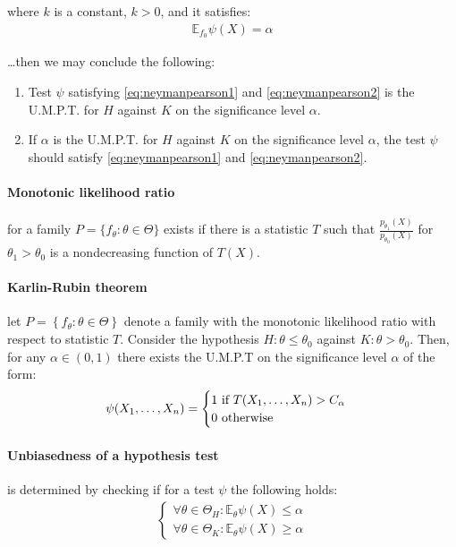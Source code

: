 where $k$ is a constant, $k > 0$, and it satisfies:
\begin{gather*}
\mathbb{E}_{f_0} \psi(X) = \alpha
\label{eq:neymanpearson2} \tag{B}
\end{gather*}

\noindent \ldots then we may conclude the following:
\begin{enumerate}

  \item Test $\psi$ satisfying \eqref{eq:neymanpearson1} and \eqref{eq:neymanpearson2} is the
  U.M.P.T. for $H$ against $K$ on the significance level $\alpha$.

  \item If $\alpha$ is the U.M.P.T. for $H$ against $K$ on the significance level $\alpha$, the test
  $\psi$ should satisfy \eqref{eq:neymanpearson1} and \eqref{eq:neymanpearson2}.

\end{enumerate}

\paragraph{Monotonic likelihood ratio}
for a family $P = \{ f_\theta : \theta \in \Theta \}$ exists if there is a statistic $T$
such that $\frac{ p_{\theta_1}(X) }{ p_{\theta_0}(X) }$ for $\theta_1 > \theta_0$ is a nondecreasing
function of $T(X)$.

\paragraph{Karlin-Rubin theorem}
let $P = \left\{ f_\theta : \theta \in \Theta \right\}$ denote a family with the monotonic
likelihood ratio with respect to statistic $T$. Consider the hypothesis $H: \theta \leq \theta_0$
against $K: \theta > \theta_0$. Then, for any $\alpha \in (0,1)$ there exists the U.M.P.T on the
significance level $\alpha$ of the form:
\begin{gather*}
\psi(X_{1}, \ldots, X_{n}) = \begin{cases}
1 \mbox{ if } T(X_{1}, \ldots, X_{n}) > C_\alpha \\
0 \mbox{ otherwise}
\end{cases}
\end{gather*}

\paragraph{Unbiasedness of a hypothesis test}
is determined by checking if for a test $\psi$ the following holds:
\begin{gather*}
\begin{cases}
\forall \theta \in \Theta_H : \mathbb{E}_\theta \psi(X) \leq \alpha \\
\forall \theta \in \Theta_K : \mathbb{E}_\theta \psi(X) \geq \alpha
\end{cases}
\end{gather*}

